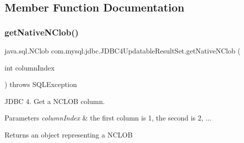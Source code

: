 \subsection{Member Function Documentation}
\mbox{\label{classcom_1_1mysql_1_1jdbc_1_1_j_d_b_c4_updatable_result_set_ada1fa51ea7ce43ee01de52ff5c0b4275}} 
\subsubsection{\texorpdfstring{get\+Native\+N\+Clob()}{getNativeNClob()}}
{\footnotesize\ttfamily java.\+sql.\+N\+Clob com.\+mysql.\+jdbc.\+J\+D\+B\+C4\+Updatable\+Result\+Set.\+get\+Native\+N\+Clob (\begin{DoxyParamCaption}\item[{int}]{column\+Index }\end{DoxyParamCaption}) throws S\+Q\+L\+Exception\hspace{0.3cm}{\ttfamily [protected]}}

J\+D\+BC 4. Get a N\+C\+L\+OB column.


\begin{DoxyParams}{Parameters}
{\em column\+Index} & the first column is 1, the second is 2, ...\\
\hline
\end{DoxyParams}
\begin{DoxyReturn}{Returns}
an object representing a N\+C\+L\+OB
\end{DoxyReturn}

